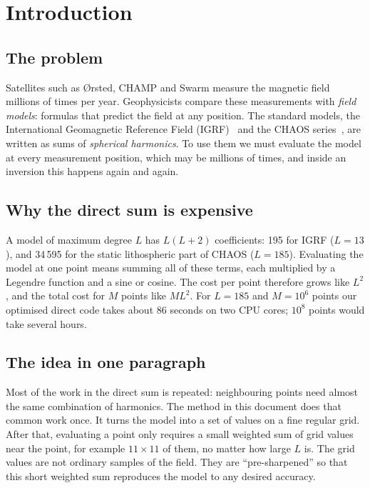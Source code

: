 \documentclass[11pt,a4paper]{article}
\theoremstyle{definition}
\begin{document}
\section{Introduction}\label{sec:intro}

\subsection{The problem}
Satellites such as \O rsted, CHAMP and Swarm measure the magnetic field millions of times per year. Geophysicists
compare these measurements with \emph{field models}: formulas that predict the field at any position. The standard
models, the International Geomagnetic Reference Field (IGRF)~\cite{alken2021} and the CHAOS series~\cite{finlay2020}, are
written as sums of \emph{spherical harmonics}. To use them we must evaluate the model at every measurement position,
which may be millions of times, and inside an inversion this happens again and again.

\subsection{Why the direct sum is expensive}
A model of maximum degree $L$ has $L(L+2)$ coefficients: 195 for IGRF ($L=13$), and 34\,595 for the static
lithospheric part of CHAOS ($L=185$). Evaluating the model at one point means summing all of these terms, each
multiplied by a Legendre function and a sine or cosine. The cost per point therefore grows like $L^2$, and the total
cost for $M$ points like $ML^2$. For $L=185$ and $M=10^6$ points our optimised direct code takes about 86 seconds on
two CPU cores; $10^8$ points would take several hours.

\subsection{The idea in one paragraph}
Most of the work in the direct sum is repeated: neighbouring points need almost the same combination of
harmonics. The method in this document does that common work once. It turns the model into a set of values on a
fine regular grid. After that, evaluating a point only requires a small weighted sum of grid values near the point,
for example $11\times11$ of them, no matter how large $L$ is. The grid values are not ordinary samples of the field.
They are ``pre-sharpened'' so that this short weighted sum reproduces the model to any desired accuracy.
\end{document}
